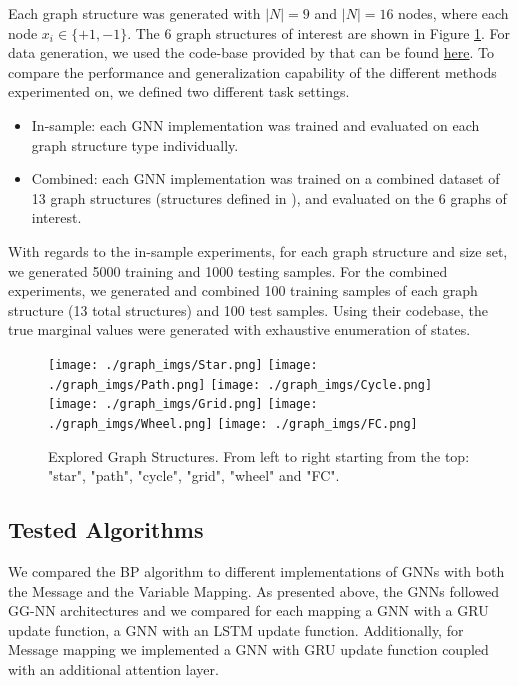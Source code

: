 \documentclass{article}
\begin{document}
Each graph structure was generated with $|N| = 9$ and $|N| = 16$ nodes,  where each node ${x_i} \in \{+ 1, -1 \}$. The 6 graph structures of interest are shown in Figure \ref{fig:graphs}. For data generation, we used the code-base provided by \cite{pgm_gnn_code} that can be found \href{https://github.com/sunfanyunn/pgm\_graph\_inference}{here}. To compare the performance and generalization capability of the different methods experimented on, we defined two different task settings. 
\begin{itemize}
    \item In-sample: each GNN implementation was trained and evaluated on each graph structure type individually.
    \item Combined: each GNN implementation was trained on a combined dataset of 13 graph structures (structures defined in \cite{inf_pgm_gnn}), and evaluated on the 6 graphs of interest.
\end{itemize}
With regards to the in-sample experiments, for each graph structure and size set, we generated 5000 training and 1000 testing samples. For the combined experiments, we generated and combined 100 training samples of each graph structure (13 total structures) and 100 test samples. Using their codebase, the true marginal values were generated with exhaustive enumeration of states.

\begin{figure}
        \centering
        \texttt{[image: ./graph\_imgs/Star.png]}
        \texttt{[image: ./graph\_imgs/Path.png]}
        \texttt{[image: ./graph\_imgs/Cycle.png]}
        \texttt{[image: ./graph\_imgs/Grid.png]}
        \texttt{[image: ./graph\_imgs/Wheel.png]}
        \texttt{[image: ./graph\_imgs/FC.png]}
        \caption{Explored Graph Structures. From left to right starting from the top: "star", "path", "cycle", "grid", "wheel" and "FC".}
        \label{fig:graphs}
\end{figure}

\subsection{Tested Algorithms}
We compared the BP algorithm to different implementations of GNNs with both the Message and the Variable Mapping. As presented above, the GNNs followed GG-NN architectures and we compared for each mapping a GNN with a GRU update function, a GNN with an LSTM update function. Additionally, for Message mapping we implemented a GNN with GRU update function coupled with an additional attention layer.
\end{document}

